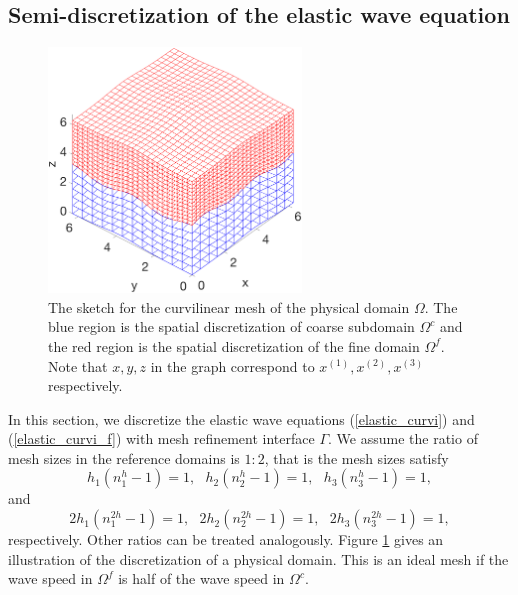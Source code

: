 \subsection{Semi-discretization of the elastic wave equation}\label{semi_discrete_form}

\begin{figure}[htbp]
	\centering
	\includegraphics[width=0.6\textwidth,trim={0.4cm 0.7cm 0.8cm 1.4cm}, clip]{physical_discretization.eps}
	\caption{The sketch for the curvilinear mesh of the physical domain $\Omega$. The blue region is the spatial discretization of coarse subdomain $\Omega^c$ and the red region is the spatial discretization of the fine domain $\Omega^f$. Note that $x,y,z$ in the graph correspond to $x^{(1)}, x^{(2)}, x^{(3)}$ respectively. 
	 }\label{physical_discretization}
\end{figure}

In this section, we discretize the elastic wave equations (\ref{elastic_curvi}) and  (\ref{elastic_curvi_f}) with mesh refinement interface $\Gamma$. We assume the ratio of mesh sizes in the reference domains is $1:2$, that is the mesh sizes satisfy
\[h_1(n_1^h-1) = 1, \ \ \ h_2(n_2^h-1) = 1, \ \ \ h_3(n_3^h-1) = 1,\]
and
\[2h_1(n_1^{2h}-1) = 1, \ \ \ 2h_2(n_2^{2h}-1) = 1, \ \ \ 2h_3(n_3^{2h}-1) = 1,\]
respectively. Other ratios can be treated analogously. Figure \ref{physical_discretization} gives an illustration of the discretization of a physical domain. This is an ideal mesh if the wave speed in $\Omega^f$ is half of the wave speed in $\Omega^c$.

